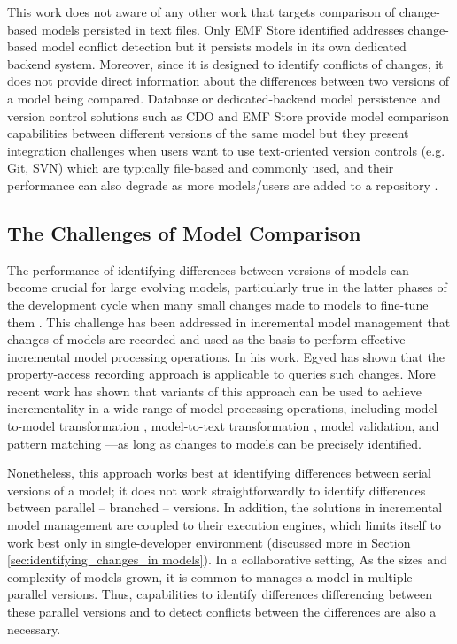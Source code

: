 This work does not aware of any other work that targets comparison of change-based models persisted in text files. Only EMF Store \cite{koegel2010emfstore} identified addresses change-based model conflict detection but it persists models in its own dedicated backend system. Moreover, since it is designed to identify conflicts of changes, it does not provide direct information about the differences between two versions of a model being compared. Database or dedicated-backend model persistence and version control solutions such as CDO \cite{eclipse2019cdo} and EMF Store provide model comparison capabilities between different versions of the same model but they present integration challenges when users want to use text-oriented version controls (e.g. Git, SVN) which are typically file-based and commonly used, and their performance can also degrade as more models/users are added to a repository \cite{KolovosRMPGCLRV13}.

\subsection{The Challenges of Model Comparison}
\label{sec:the_key_challenge_of_incrementality}

The performance of identifying differences between versions of models can become crucial for large evolving models, particularly true in the latter phases of the development cycle when many small changes made to models to fine-tune them \cite{selic2003pragmatics}. This challenge has been addressed in incremental model management that changes of models are recorded and used as the basis to perform effective incremental model processing operations. In his work, Egyed \cite{egyed2011automatically} has shown that the property-access recording approach is applicable to queries such changes. More recent work has shown that variants of this approach can be used to achieve incrementality in a wide range of model processing operations, including model-to-model transformation \cite{jouault2010towards}, model-to-text transformation \cite{DBLP:conf/ecmdafa/OgunyomiRK15}, model validation, and pattern matching \cite{DBLP:conf/ecmdafa/RathHV12}---as long as changes to models can be precisely identified.  

Nonetheless, this approach works best at identifying differences between serial versions of a model; it does not work straightforwardly to identify differences between parallel -- branched -- versions. In addition, the solutions in incremental model management are coupled to their execution engines, which limits itself to work best only in single-developer environment (discussed more in Section \ref{sec:identifying_changes_in models}). In a collaborative setting, As the sizes and complexity of models grown, it is common to manages a model in multiple parallel versions. Thus, capabilities to identify differences differencing between these parallel versions and to detect conflicts between the differences are also a necessary.

